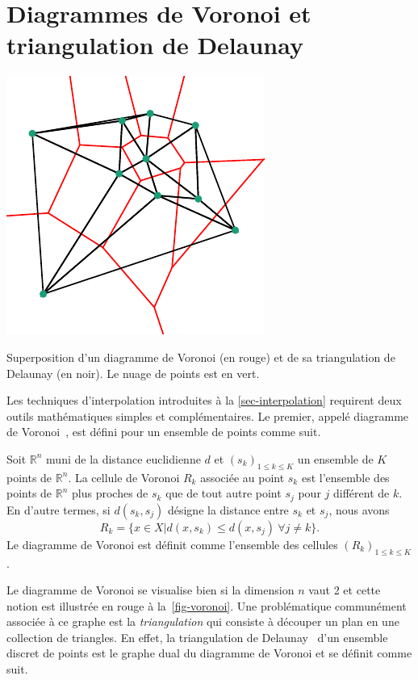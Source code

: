             \section{Diagrammes de Voronoi et triangulation de Delaunay}\label{abstr-voronoi-delaunay}
        
        \begin{marginfigure}
            \centering
            \includegraphics[]{img/chapitre2/figure3/Voronoi.pdf}
            \caption{Superposition d'un diagramme de Voronoi (en rouge) et de sa triangulation de Delaunay (en noir). Le nuage de points est en vert.}
            \label{fig-voronoi}
        \end{marginfigure}
        Les techniques d'interpolation introduites à la \cref{sec-interpolation} requirent deux outils mathématiques simples et complémentaires. Le premier, appelé diagramme de Voronoi~\cite{cazals2006delaunay}, est défini pour un ensemble de points comme suit.
        \begin{mydef}
            Soit $\mathbb{R}^n$ muni de la distance euclidienne $d$ et $(s_k)_{1\leq k\leq K}$ un ensemble de $K$ points de $\mathbb{R}^n$. La cellule de Voronoi $R_k$ associée au point $s_k$ est l'ensemble des points de $\mathbb{R}^n$ plus proches de $s_k$ que de tout autre point $s_j$ pour $j$ différent de $k$. En d'autre termes, si $d(s_k, s_j)$ désigne la distance entre $s_k$ et $s_j$, nous avons
            \[R_k=\{x\in X | d(x, s_k) \leq d(x, s_j) \ \forall j\neq k\}.\]
            Le diagramme de Voronoi est définit comme l'ensemble des cellules $(R_k)_{1\leq k\leq K}$.
        \end{mydef}
        Le diagramme de Voronoi se visualise bien si la dimension $n$ vaut 2 et cette notion est illustrée en rouge à la~\cref{fig-voronoi}. Une problématique communément associée à ce graphe est la \emph{triangulation} qui consiste à découper un plan en une collection de triangles. En effet, la triangulation de Delaunay~\cite{cazals2006delaunay} d'un ensemble discret de points est le graphe dual du diagramme de Voronoi et se définit comme suit.
